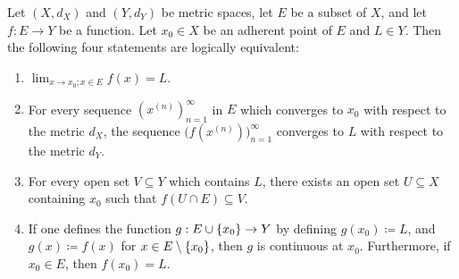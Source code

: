 \begin{prop}\label{ii:3.1.5}
  Let \((X, d_X)\) and \((Y, d_Y)\) be metric spaces, let \(E\) be a subset of \(X\), and let \(f : E \to Y\) be a function.
  Let \(x_0 \in X\) be an adherent point of \(E\) and \(L \in Y\).
  Then the following four statements are logically equivalent:
  \begin{enumerate}
    \item\label{ii:3.1.5.a} \(\lim_{x \to x_0 ; x \in E} f(x) = L\).
    \item\label{ii:3.1.5.b} For every sequence \((x^{(n)})_{n = 1}^\infty\) in \(E\) which converges to \(x_0\) with respect to the metric \(d_X\), the sequence \(\big(f(x^{(n)})\big)_{n = 1}^\infty\) converges to \(L\) with respect to the metric \(d_Y\).
    \item\label{ii:3.1.5.c} For every open set \(V \subseteq Y\) which contains \(L\), there exists an open set \(U \subseteq X\) containing \(x_0\) such that \(f(U \cap E) \subseteq V\).
    \item\label{ii:3.1.5.d} If one defines the function \(g : E \cup \left\lbrace x_0\right\rbrace \to Y\) by defining \(g(x_0) \coloneqq L\), and \(g(x) \coloneqq f(x)\) for \(x \in E \setminus \left\lbrace x_0\right\rbrace\), then \(g\) is continuous at \(x_0\).
    Furthermore, if \(x_0 \in E\), then \(f(x_0) = L\).
  \end{enumerate}
\end{prop}

